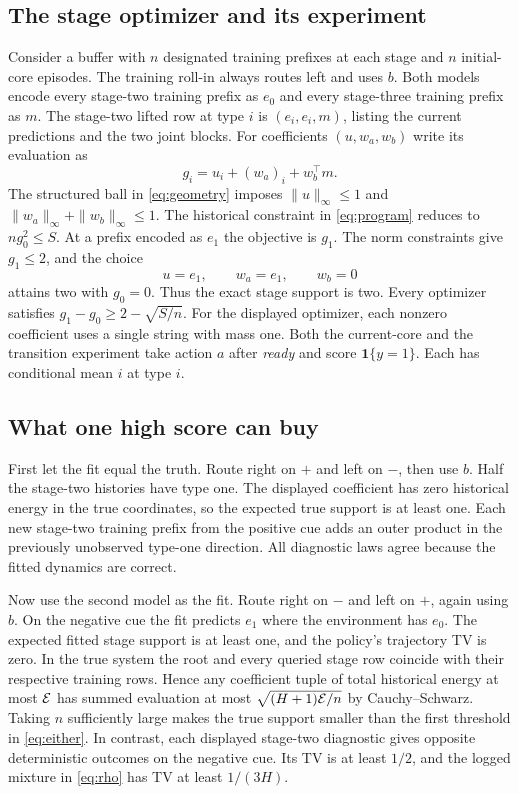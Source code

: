 \subsection{The stage optimizer and its experiment}
Consider a buffer with $n$ designated training prefixes at each stage and $n$ initial-core episodes. The training roll-in always routes left and uses $b$. Both models encode every stage-two training prefix as $e_0$ and every stage-three training prefix as $m$. The stage-two lifted row at type $i$ is $(e_i,e_i,m)$, listing the current predictions and the two joint blocks. For coefficients $(u,w_a,w_b)$ write its evaluation as
\[
 g_i=u_i+(w_a)_i+w_b^\top m .
\]
The structured ball in \eqref{eq:geometry} imposes $\|u\|_\infty\le1$ and $\|w_a\|_\infty+\|w_b\|_\infty\le1$. The historical constraint in \eqref{eq:program} reduces to $n g_0^2\le S$. At a prefix encoded as $e_1$ the objective is $g_1$. The norm constraints give $g_1\le2$, and the choice
\[
 u=e_1,\qquad w_a=e_1,\qquad w_b=0
\]
attains two with $g_0=0$. Thus the exact stage support is two. Every optimizer satisfies $g_1-g_0\ge 2-\sqrt{S/n}$. For the displayed optimizer, each nonzero coefficient uses a single string with mass one. Both the current-core and the transition experiment take action $a$ after \emph{ready} and score $\mathbf1\{y=1\}$. Each has conditional mean $i$ at type $i$.

\subsection{What one high score can buy}
First let the fit equal the truth. Route right on $+$ and left on $-$, then use $b$. Half the stage-two histories have type one. The displayed coefficient has zero historical energy in the true coordinates, so the expected true support is at least one. Each new stage-two training prefix from the positive cue adds an outer product in the previously unobserved type-one direction. All diagnostic laws agree because the fitted dynamics are correct.

Now use the second model as the fit. Route right on $-$ and left on $+$, again using $b$. On the negative cue the fit predicts $e_1$ where the environment has $e_0$. The expected fitted stage support is at least one, and the policy's trajectory TV is zero. In the true system the root and every queried stage row coincide with their respective training rows. Hence any coefficient tuple of total historical energy at most $\mathcal E$ has summed evaluation at most $\sqrt{(H+1)\mathcal E/n}$ by Cauchy--Schwarz. Taking $n$ sufficiently large makes the true support smaller than the first threshold in \eqref{eq:either}. In contrast, each displayed stage-two diagnostic gives opposite deterministic outcomes on the negative cue. Its TV is at least $1/2$, and the logged mixture in \eqref{eq:rho} has TV at least $1/(3H)$.

